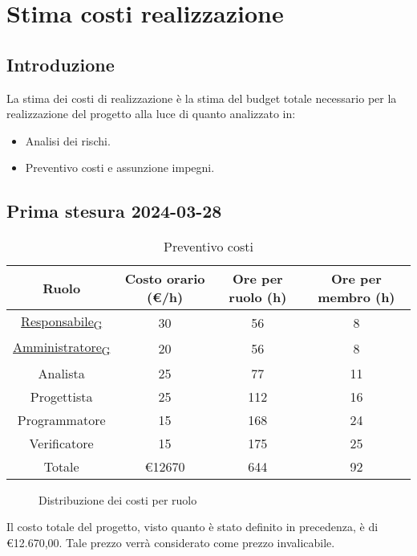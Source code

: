 \section{Stima costi realizzazione}
\subsection{Introduzione}
La stima dei costi di realizzazione è la stima del budget totale necessario per la realizzazione del progetto alla luce di quanto analizzato in:
\begin{itemize}
    \item Analisi dei rischi.
    \item Preventivo costi e assunzione impegni.
\end{itemize}

\subsection{Prima stesura 2024-03-28}

\begin{table}[!h]
	\centering
		\begin{tabular}{ |c|c|c|c| }
			\hline
			\textbf{Ruolo}   & \textbf{Costo orario (€/h)} & \textbf{Ore per ruolo (h)} & \textbf{Ore per membro (h)} \\
			\hline
			\href{https://7last.github.io/docs/rtb/documentazione-interna/glossario\#responsabile}{Responsabile\textsubscript{G}}   & 30           & 56            & 8              \\
			\href{https://7last.github.io/docs/rtb/documentazione-interna/glossario\#amministratore}{Amministratore\textsubscript{G}} & 20           & 56            & 8              \\
			Analista       & 25           & 77            & 11             \\
			Progettista    & 25           & 112           & 16             \\
			Programmatore  & 15           & 168           & 24             \\
			Verificatore   & 15           & 175           & 25             \\
			\hline
			Totale         & €12670       & 644           & 92             \\
			\hline
		\end{tabular}
        \caption{Preventivo costi}
    \label{tab:2}
\end{table}


\begin{figure*}
    \centering
    \caption{Distribuzione dei costi per ruolo}
    \label{fig:1}
    \end{figure*}

Il costo totale del progetto, visto quanto è stato definito in precedenza, è di €12.670,00. Tale prezzo verrà considerato come prezzo invalicabile. 
\newpage
